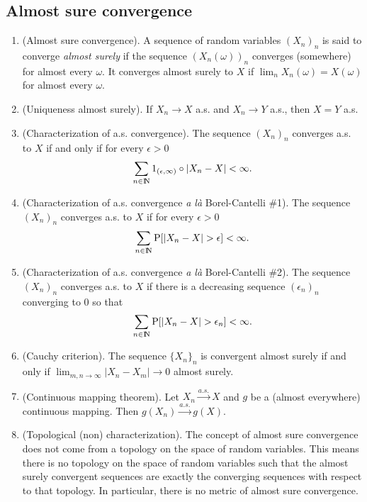 \documentclass[a4paper,10pt]{article}
\begin{document}
\subsection{Almost sure convergence}
\begin{enumerate}
 \item (Almost sure convergence). A sequence of random variables $(X_n)_n$ is said to converge \textit{almost surely}
       if the sequence $(X_n(\omega))_n$ converges (somewhere) for almost every $\omega$. It converges almost surely to $X$
       if $\lim_n X_n(\omega) = X(\omega)$ for almost every $\omega$.
              
       
 \item (Uniqueness almost surely). If $X_n \to X$ a.s. and $X_n \to Y$ a.s., then $X=Y$ a.s.
 
 \item (Characterization of a.s. convergence). The sequence $(X_n)_n$ converges a.s. to $X$ if and only if for every $\epsilon>0$
       \[
        \sum_{n\in\N}1_{(\epsilon,\infty)}\circ|X_n - X| < \infty.
       \]

 \item (Characterization of a.s. convergence \textit{a l\`a} Borel-Cantelli \#1).
       The sequence $(X_n)_n$ converges a.s. to $X$ if for every $\epsilon>0$
       \[
        \sum_{n\in\N}\prob[|X_n-X|>\epsilon] < \infty.
       \]

 \item (Characterization of a.s. convergence \textit{a l\`a} Borel-Cantelli \#2).
       The sequence $(X_n)_n$ converges a.s. to $X$ if there is a decreasing sequence $(\epsilon_n)_n$
       converging to $0$ so that 
       \[
        \sum_{n\in\N}\prob[|X_n-X|>\epsilon_n] < \infty.
       \]     
       
 \item (Cauchy criterion). The sequence $\{X_n\}_n$ is convergent almost surely if and only if
       $\lim_{m,n\to \infty}|X_n-X_m|\to 0$ almost surely.
       
 \item (Continuous mapping theorem). Let $X_n \overset{a.s.}{\to} X$ and $g$ be a (almost everywhere)
       continuous mapping. Then
       $g(X_n) \overset{a.s.}{\to} g(X)$.
       
 \item (Topological (non) characterization).
       The concept of almost sure convergence does not come from a topology on the space 
       of random variables. This means there is no topology on the space of random variables 
       such that the almost surely convergent sequences are exactly the converging sequences 
       with respect to that topology. In particular, there is no metric of almost sure convergence.        
              
\end{enumerate}
\end{document}

